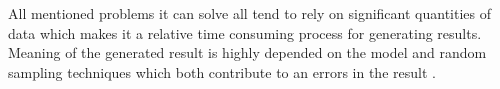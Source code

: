 All  mentioned  problems it can solve all tend to rely on significant quantities of data which makes it a relative time consuming process for generating results. Meaning of the generated result is highly depended on the model and random sampling techniques which both contribute to an errors in the result \cite{stephanie_monte_2015,wikipedia_monte_2019,alon_honig_introduction_nodate}.
